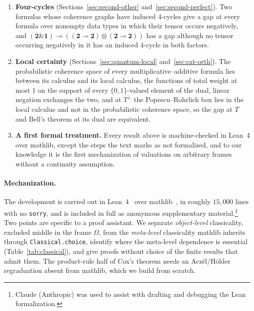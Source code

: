 \begin{enumerate}
\item \textbf{Four-cycles} (Sections~\ref{sec:second-other}
  and~\ref{sec:second-perfect}).  Two formulas whose coherence graphs
  have induced $4$-cycles give a gap at every formula over nonempty data
  types in which their tensor occurs negatively, and
  $(\mathbf{2} \mathbin{\&} \mathbf{1}) \multimap ((\mathbf{2} \multimap
  \mathbf{2}) \otimes (\mathbf{2} \multimap \mathbf{2}))$ has a gap
  although no tensor occurring negatively in it has an induced $4$-cycle
  in both factors.

\item \textbf{Local certainty} (Sections~\ref{sec:quantum-local}
  and~\ref{sec:cat-orth}).  The probabilistic coherence space of every
  multiplicative--additive formula lies between its calculus and its
  local calculus, the functions of total weight at most $1$ on the
  support of every $\{0,1\}$-valued element of the dual, linear negation
  exchanges the two, and at $T^{\perp}$ the Popescu--Rohrlich box lies in
  the local calculus and not in the probabilistic coherence space, so the
  gap at $T$ and Bell's theorem at its dual are equivalent.

\item \textbf{A first formal treatment.}  Every result above is
  machine-checked in Lean~4 over \textsf{mathlib}, except the steps the
  text marks as not formalized, and to our knowledge it is the first
  mechanization of valuations on arbitrary frames without a continuity
  assumption.
\end{enumerate}

\paragraph{Mechanization.}
The development is carried out in Lean~4~\cite{moura-ullrich2021} over
\textsf{mathlib}~\cite{mathlib2020}, in roughly $15{,}000$ lines with no
\texttt{sorry}, and is included in full as anonymous supplementary
material.\footnote{Claude (Anthropic) was used to assist with
drafting and debugging the Lean formalization.} Two points are specific
to a proof assistant.  We separate \emph{object-level} classicality,
excluded middle in the frame $\Omega$, from the \emph{meta-level}
classicality \textsf{mathlib} inherits through \texttt{Classical.choice},
identify where the meta-level dependence is essential
(Table~\ref{tab:classical}), and give proofs without choice of the
finite results that admit them.  
The product-rule half of Cox's theorem needs an
Acz\'el/H\"older regraduation absent from \textsf{mathlib}, which we
build from scratch.
